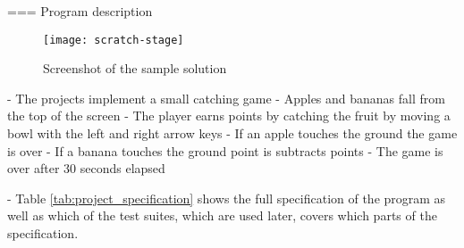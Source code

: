 === Program description
\begin{wrapfigure}{r}{0.35\textwidth + 5mm}
    \centering
    \vspace{-3mm}
    \texttt{[image: scratch-stage]}
    \caption{Screenshot of the sample solution}
    \label{fig:screenshot_of_the_sample_solution}
\end{wrapfigure}
- The projects implement a small catching game
- Apples and bananas fall from the top of the screen
- The player earns points by catching the fruit by moving a bowl with the left and right arrow keys
- If an apple touches the ground the game is over
- If a banana touches the ground point is subtracts points
- The game is over after 30 seconds elapsed

- Table \ref{tab:project_specification} shows the full specification of the program as well as which of the test suites, which are used later, covers which parts of the specification.

